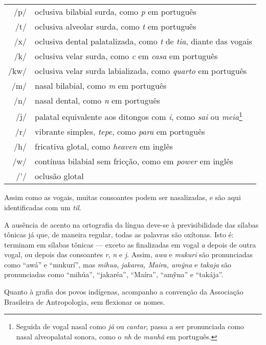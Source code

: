 \begin{tabular}{rl}
/p/ & oclusiva bilabial surda, como \textit{p} em português\\
/t/ & oclusiva alveolar surda, como \textit{t} em português\\
/x/ & oclusiva dental palatalizada, como \textit{t} de \textit{tia}, diante das vogais\\
/k/ & oclusiva velar surda, como \textit{c} em \textit{casa} em português\\
/kw/ & oclusiva velar surda labializada, como \textit{quarto} em português\\
/m/ & nasal bilabial, como \textit{m} em português\\
/n/ & nasal dental, como \textit{n} em português\\
/j/ & palatal equivalente aos ditongos com \textit{i}, como \textit{sai} ou \textit{meia}\footnote{Seguida de vogal nasal como \textit{jã} ou \textit{cantar}, passa a ser pronunciada como nasal alveopalatal sonora, como o \textit{nh} de \textit{manhã} em português.}\\
/r/ & vibrante simples, \textit{tepe}, como \textit{para} em português\\
/h/ & fricativa glotal, como \textit{heaven} em inglês\\
/w/ & contínua bilabial sem fricção, como em \textit{power} em inglês\\
/'/ & oclusão glotal
\end{tabular}

\bigskip
\medskip

Assim como as vogais, muitas consoantes podem ser nasalizadas, e são
aqui identificadas com um \textit{til}.

A ausência de acento na ortografia da língua deve-se à previsibilidade
das sílabas tônicas já que, de maneira regular, todas as palavras são
oxítonas. Isto é: terminam em sílabas tônicas --- exceto as finalizadas em
vogal \textit{a} depois de outra vogal, ou depois das consoantes \textit{r}, \textit{n} e \textit{j}.
Assim, \textit{awa} e \textit{mukuri} são pronunciadas como ``awá'' e
``mukurí'', mas \textit{mihua}, \textit{jakarea, Maira, amỹna} e \textit{takaja} são
pronunciadas como ``mihúa'', ``jakaréa'', ``Maíra'', ``amỹna'' e
``takája''.

Quanto à grafia dos povos indígenas, acompanho a convenção da Associação Brasileira de Antropologia, sem flexionar os nomes.


